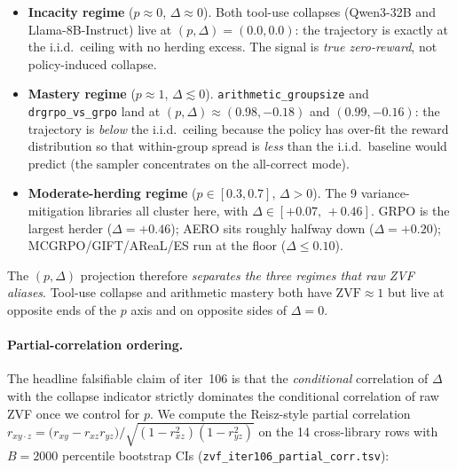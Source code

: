 \begin{itemize}
\item \textbf{Incacity regime} ($p\!\approx\!0$, $\Delta\!\approx\!0$).
Both tool-use collapses (Qwen3-32B and Llama-8B-Instruct) live at
$(p,\Delta)=(0.0, 0.0)$: the trajectory is exactly at the i.i.d.\
ceiling with no herding excess. The signal is \emph{true
zero-reward}, not policy-induced collapse.
\item \textbf{Mastery regime} ($p\!\approx\!1$, $\Delta\!\lesssim\!0$).
\texttt{arithmetic\_groupsize} and \texttt{drgrpo\_vs\_grpo} land at
$(p,\Delta)\approx(0.98,-0.18)$ and $(0.99,-0.16)$: the trajectory is
\emph{below} the i.i.d.\ ceiling because the policy has over-fit the
reward distribution so that within-group spread is \emph{less} than the
i.i.d.\ baseline would predict (the sampler concentrates on the
all-correct mode).
\item \textbf{Moderate-herding regime} ($p\!\in\![0.3,0.7]$,
$\Delta\!>\!0$). The 9 variance-mitigation libraries all cluster here,
with $\Delta\!\in\![+0.07,\,+0.46]$. GRPO is the largest herder
($\Delta=+0.46$); AERO sits roughly halfway down
($\Delta=+0.20$); MCGRPO/GIFT/AReaL/ES run at the floor
($\Delta\!\le\!0.10$).
\end{itemize}

\noindent The $(p,\Delta)$ projection therefore \emph{separates the three
regimes that raw ZVF aliases}. Tool-use collapse and arithmetic mastery
both have $\mathrm{ZVF}\approx 1$ but live at opposite ends of the $p$
axis and on opposite sides of $\Delta=0$.

\paragraph{Partial-correlation ordering.}
The headline falsifiable claim of iter~106 is that the
\emph{conditional} correlation of $\Delta$ with the collapse indicator
strictly dominates the conditional correlation of raw ZVF once we
control for $p$. We compute the Reisz-style partial correlation
$r_{xy\cdot z}=\bigl(r_{xy}-r_{xz}r_{yz}\bigr)/\sqrt{(1-r_{xz}^{2})(1-r_{yz}^{2})}$
on the 14 cross-library rows with $B{=}2000$ percentile bootstrap CIs
(\texttt{zvf\_iter106\_partial\_corr.tsv}):

